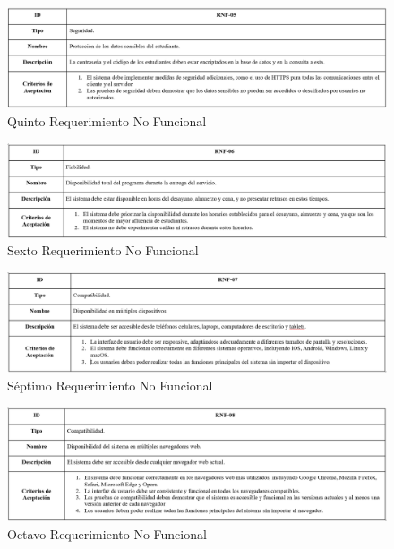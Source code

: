 \documentclass[stu, 12pt, letterpaper, donotrepeattitle, floatsintext, natbib]{apa7}
\begin{document}
\begin{figure}[H]
	\caption[]{Quinto Requerimiento No Funcional}
	\label{Quinto Requerimiento No Funcional}
	\includegraphics[width=1\linewidth]{Requerimientos No Funcionales/5. Requerimiento No Funcional.png}
\end{figure}

\begin{figure}[H]
	\caption[]{Sexto Requerimiento No Funcional}
	\label{Sexto Requerimiento No Funcional}
	\includegraphics[width=1\linewidth]{Requerimientos No Funcionales/6. Requerimiento No Funcional.png}
\end{figure}

\begin{figure}[H]
	\caption[]{Séptimo Requerimiento No Funcional}
	\label{Séptimo Requerimiento No Funcional}
	\includegraphics[width=1\linewidth]{Requerimientos No Funcionales/7. Requerimiento No Funcional.png}
\end{figure}

\begin{figure}[H]
	\caption[]{Octavo Requerimiento No Funcional}
	\label{Octavo Requerimiento No Funcional}
	\includegraphics[width=1\linewidth]{Requerimientos No Funcionales/8. Requerimiento No Funcional.png}
\end{figure}
\end{document}
